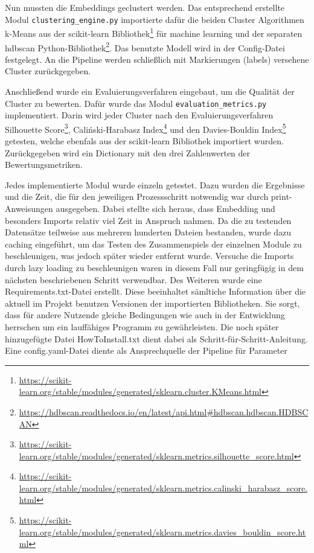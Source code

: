 Nun mussten die Embeddings geclustert werden. Das entsprechend erstellte Modul \texttt{clustering\_engine.py} importierte dafür die beiden Cluster Algorithmen k-Means aus der scikit-learn Bibliothek\footnote{\url{https://scikit-learn.org/stable/modules/generated/sklearn.cluster.KMeans.html}} für machine learning und der separaten hdbscan Python-Bibliothek\footnote{\url{https://hdbscan.readthedocs.io/en/latest/api.html\#hdbscan.hdbscan.HDBSCAN}}. Das benutzte Modell wird in der Config-Datei festgelegt. An die Pipeline werden schließlich mit Markierungen (labels) versehene Cluster zurückgegeben.

Anschließend wurde ein Evaluierungsverfahren eingebaut, um die Qualität der Cluster zu bewerten. Dafür wurde das Modul \texttt{evaluation\_metrics.py} implementiert. Darin wird jeder Cluster nach den Evaluierungsverfahren Silhouette Score\footnote{\url{https://scikit-learn.org/stable/modules/generated/sklearn.metrics.silhouette_score.html}}, Caliński-Harabasz Index\footnote{\url{https://scikit-learn.org/stable/modules/generated/sklearn.metrics.calinski_harabasz_score.html}} und den Davies-Bouldin Index\footnote{\url{https://scikit-learn.org/stable/modules/generated/sklearn.metrics.davies_bouldin_score.html}} getesten, welche ebenfals aus der scikit-learn Bibliothek importiert wurden. Zurückgegeben wird ein Dictionary mit den drei Zahlenwerten der Bewertungsmetriken.

Jedes implementierte Modul wurde einzeln getestet. Dazu wurden die Ergebnisse und die Zeit, die für den jeweiligen Prozessschritt notwendig war durch print-Anweisungen ausgegeben. Dabei stellte sich heraus, dass Embedding und besonders Imports relativ viel Zeit in Anspruch nahmen. Da die zu testenden Datensätze teilweise aus mehreren hunderten Dateien bestanden, wurde dazu caching eingeführt, um das Testen des Zusammenspiels der einzelnen Module zu beschleunigen, was jedoch später wieder entfernt wurde. Versuche die Imports durch lazy loading zu beschleunigen waren in diesem Fall nur geringfügig in dem nächsten beschriebenen Schritt verwendbar. Des Weiteren wurde eine Requirements.txt-Datei erstellt. Diese beeinhaltet sämltiche Information über die aktuell im Projekt benutzen Versionen der importierten Bibliotheken. Sie sorgt, dass für andere Nutzende gleiche Bedingungen wie auch in der Entwicklung herrschen um ein lauffähiges Programm zu gewährleisten. Die noch später hinzugefügte Datei HowToInstall.txt dient dabei als Schritt-für-Schritt-Anleitung. Eine config.yaml-Datei diente als Ansprechquelle der Pipeline für Parameter 

